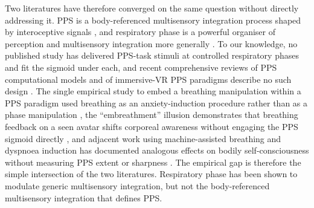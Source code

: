 Two literatures have therefore converged on the same question without directly addressing it. PPS is a body-referenced multisensory integration process shaped by interoceptive signals \citep{Ardizzi2018, salvato_2020, bogdanova_2021}, and respiratory phase is a powerful organiser of perception and multisensory integration more generally \citep{saltafossi_2025, kluger_2021, grund_2021}. To our knowledge, no published study has delivered PPS-task stimuli at controlled respiratory phases and fit the sigmoid under each, and recent comprehensive reviews of PPS computational models and of immersive-VR PPS paradigms describe no such design \citep{bertoni_2025, karakoc_2025}. The single empirical study to embed a breathing manipulation within a PPS paradigm used breathing as an anxiety-induction procedure rather than as a phase manipulation \citep{spaccasassi_2019}, the ``embreathment'' illusion demonstrates that breathing feedback on a seen avatar shifts corporeal awareness without engaging the PPS sigmoid directly \citep{monti2020embreathment}, and adjacent work using machine-assisted breathing and dyspnoea induction has documented analogous effects on bodily self-consciousness without measuring PPS extent or sharpness \citep{Allard2017, Betka2020, Betka2022}. The empirical gap is therefore the simple intersection of the two literatures. Respiratory phase has been shown to modulate generic multisensory integration, but not the body-referenced multisensory integration that defines PPS.

